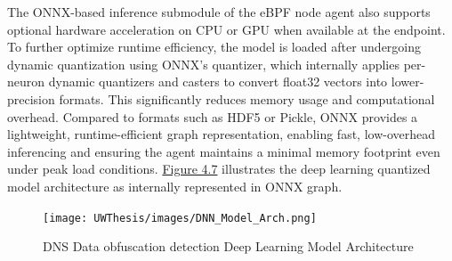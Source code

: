 \documentclass [11pt, proquest] {uwthesis}[2020/02/24]
\begin{document}
The ONNX-based inference submodule of the eBPF node agent also supports optional hardware acceleration on CPU or GPU when available at the endpoint. To further optimize runtime efficiency, the model is loaded after undergoing dynamic quantization using ONNX’s quantizer, which internally applies per-neuron dynamic quantizers and casters to convert float32 vectors into lower-precision formats. This significantly reduces memory usage and computational overhead. Compared to formats such as HDF5 or Pickle, ONNX provides a lightweight, runtime-efficient graph representation, enabling fast, low-overhead inferencing and ensuring the agent maintains a minimal memory footprint even under peak load conditions. \hyperref[sec:model_arch]{Figure 4.7} illustrates the deep learning quantized model architecture as internally represented in ONNX graph. 




\begin{figure}[H]
\texttt{[image: UWThesis/images/DNN\_Model\_Arch.png]}
\caption{DNS Data obfuscation detection Deep Learning Model Architecture}
\label{sec:model_arch}
\end{figure}
\end{document}
